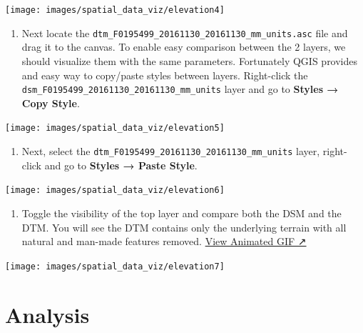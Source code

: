 \documentclass[
  12pt,
  a4paper]{article}
\providecommand{\tightlist}{%
  \setlength{\itemsep}{0pt}\setlength{\parskip}{0pt}}
\begin{document}
\begin{center}\texttt{[image: images/spatial\_data\_viz/elevation4]} \end{center}

\begin{enumerate}
\def\labelenumi{\arabic{enumi}.}
\setcounter{enumi}{4}
\tightlist
\item
  Next locate the
  \texttt{dtm\_F0195499\_20161130\_20161130\_mm\_units.asc} file and
  drag it to the canvas. To enable easy comparison between the 2 layers,
  we should visualize them with the same parameters. Fortunately QGIS
  provides and easy way to copy/paste styles between layers. Right-click
  the \texttt{dsm\_F0195499\_20161130\_20161130\_mm\_units} layer and go
  to \textbf{Styles → Copy Style}.
\end{enumerate}

\begin{center}\texttt{[image: images/spatial\_data\_viz/elevation5]} \end{center}

\begin{enumerate}
\def\labelenumi{\arabic{enumi}.}
\setcounter{enumi}{5}
\tightlist
\item
  Next, select the \texttt{dtm\_F0195499\_20161130\_20161130\_mm\_units}
  layer, right-click and go to \textbf{Styles → Paste Style}.
\end{enumerate}

\begin{center}\texttt{[image: images/spatial\_data\_viz/elevation6]} \end{center}

\begin{enumerate}
\def\labelenumi{\arabic{enumi}.}
\setcounter{enumi}{6}
\tightlist
\item
  Toggle the visibility of the top layer and compare both the DSM and
  the DTM. You will see the DTM contains only the underlying terrain
  with all natural and man-made features removed.
  \href{https://courses.spatialthoughts.com/images/spatial_data_viz/elevation7.gif}{View
  Animated GIF ↗}
\end{enumerate}

\begin{center}\texttt{[image: images/spatial\_data\_viz/elevation7]} \end{center}

\newpage

\hypertarget{analysis}{%
\section{Analysis}\label{analysis}}
\end{document}
